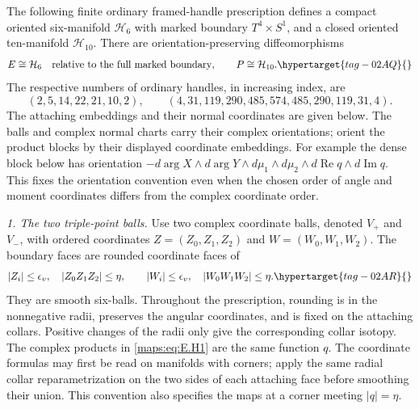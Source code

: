 \begin{theorem}\hypertarget{tag-02MM}{}\label{maps:src:E.2.21}


The following finite ordinary framed-handle prescription defines a
compact oriented six-manifold $\mathcal H_6$ with marked boundary
$T^4\times S^1$, and a closed oriented ten-manifold $\mathcal H_{10}$.
There are orientation-preserving diffeomorphisms
\begin{equation}
 E\cong\mathcal H_6\quad\hbox{relative to the full marked boundary},
 \qquad P\cong\mathcal H_{10}.
 \hypertarget{tag-02AQ}{}\label{maps:eq:E.H0}
\end{equation}
The respective numbers of ordinary handles, in increasing index, are
\[
 (2,5,14,22,21,10,2),\qquad
 (4,31,119,290,485,574,485,290,119,31,4).
\]
The attaching embeddings and their normal coordinates are given below.  
The balls and complex normal charts carry their complex orientations;
orient the product blocks by their displayed coordinate embeddings.
For example the dense block below has orientation
$-d\arg X\wedge d\arg Y\wedge d\mu_1\wedge d\mu_2
\wedge d\operatorname{Re}q\wedge d\operatorname{Im}q$.
This fixes the orientation convention even when the chosen order of
angle and moment coordinates differs from the complex coordinate order.

\emph{1. The two triple-point balls.}
Use two complex coordinate balls, denoted $V_+$ and $V_-$, with
ordered coordinates $Z=(Z_0,Z_1,Z_2)$ and $W=(W_0,W_1,W_2)$.
The boundary faces are rounded coordinate faces of
\begin{equation}
 |Z_i|\leq\epsilon_v,\quad |Z_0Z_1Z_2|\leq\eta,
 \qquad
 |W_i|\leq\epsilon_v,\quad |W_0W_1W_2|\leq\eta.
 \hypertarget{tag-02AR}{}\label{maps:eq:E.H1}
\end{equation}
They are smooth six-balls.  Throughout the prescription, rounding is
in the nonnegative radii, preserves the angular coordinates, and is
fixed on the attaching collars.  Positive changes of the radii only
give the corresponding collar isotopy.  The complex products in
\eqref{maps:eq:E.H1} are the same function $q$.
The coordinate formulas may first be read on manifolds with corners;
apply the same radial collar reparametrization on the two sides of
each attaching face before smoothing their union.  This convention
also specifies the maps at a corner meeting $|q|=\eta$.


\end{theorem}
